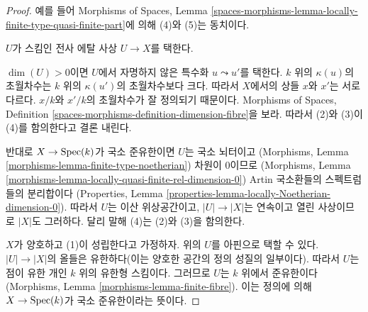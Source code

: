 \begin{proof}
예를 들어 Morphisms of Spaces, Lemma
\ref{spaces-morphisms-lemma-locally-finite-type-quasi-finite-part}에
의해 (4)와 (5)는 동치이다.

\medskip\noindent
$U$가 스킴인 전사 에탈 사상 $U \to X$를 택한다.

\medskip\noindent
$\dim(U) > 0$이면 $U$에서 자명하지 않은 특수화
$u \leadsto u'$를 택한다. $k$ 위의 $\kappa(u)$의 초월차수는 $k$ 위의
$\kappa(u')$의 초월차수보다 크다. 따라서 $X$에서의 상들 $x$와 $x'$는
서로 다르다. $x/k$와 $x'/k$의 초월차수가 잘 정의되기 때문이다.
Morphisms of Spaces, Definition
\ref{spaces-morphisms-definition-dimension-fibre}을 보라.
따라서 (2)와 (3)이 (4)를 함의한다고 결론 내린다.

\medskip\noindent
반대로 $X \to \mathop{\mathrm{Spec}}(k)$가 국소 준유한이면 $U$는 국소 뇌터이고
(Morphisms, Lemma \ref{morphisms-lemma-finite-type-noetherian})
차원이 $0$이므로
(Morphisms, Lemma \ref{morphisms-lemma-locally-quasi-finite-rel-dimension-0})
Artin 국소환들의 스펙트럼들의 분리합이다
(Properties, Lemma \ref{properties-lemma-locally-Noetherian-dimension-0}).
따라서 $U$는 이산 위상공간이고, $|U| \to |X|$는 연속이고 열린
사상이므로 $|X|$도 그러하다. 달리 말해 (4)는 (2)와 (3)을 함의한다.

\medskip\noindent
$X$가 양호하고 (1)이 성립한다고 가정하자. 위의 $U$를 아핀으로
택할 수 있다. $|U| \to |X|$의 올들은 유한하다(이는 양호한 공간의
정의 성질의 일부이다). 따라서 $U$는 점이 유한 개인 $k$ 위의
유한형 스킴이다. 그러므로 $U$는 $k$ 위에서 준유한이다
(Morphisms, Lemma \ref{morphisms-lemma-finite-fibre}).
이는 정의에 의해 $X \to \mathop{\mathrm{Spec}}(k)$가 국소 준유한이라는 뜻이다.
\end{proof}

